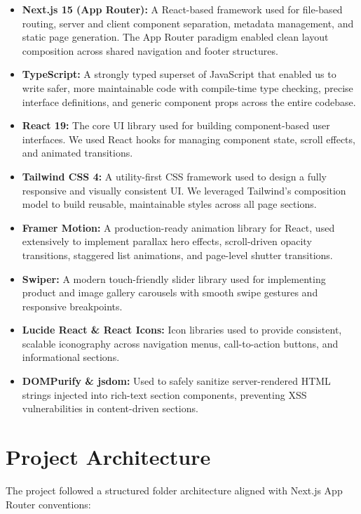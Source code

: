 \documentclass[12pt, oneside, a4paper]{book}
\begin{document}
\begin{doublespace}
\begin{itemize}
  \item \textbf{Next.js 15 (App Router):} A React-based framework used for file-based
  routing, server and client component separation, metadata management, and static
  page generation. The App Router paradigm enabled clean layout composition across
  shared navigation and footer structures.
  \item \textbf{TypeScript:} A strongly typed superset of JavaScript that enabled us
  to write safer, more maintainable code with compile-time type checking, precise
  interface definitions, and generic component props across the entire codebase.
  \item \textbf{React 19:} The core UI library used for building component-based user
  interfaces. We used React hooks for managing component state, scroll effects, and
  animated transitions.
  \item \textbf{Tailwind CSS 4:} A utility-first CSS framework used to design a
  fully responsive and visually consistent UI. We leveraged Tailwind's composition
  model to build reusable, maintainable styles across all page sections.
  \item \textbf{Framer Motion:} A production-ready animation library for React, used
  extensively to implement parallax hero effects, scroll-driven opacity transitions,
  staggered list animations, and page-level shutter transitions.
  \item \textbf{Swiper:} A modern touch-friendly slider library used for implementing
  product and image gallery carousels with smooth swipe gestures and responsive
  breakpoints.
  \item \textbf{Lucide React \& React Icons:} Icon libraries used to provide
  consistent, scalable iconography across navigation menus, call-to-action buttons,
  and informational sections.
  \item \textbf{DOMPurify \& jsdom:} Used to safely sanitize server-rendered HTML
  strings injected into rich-text section components, preventing XSS vulnerabilities
  in content-driven sections.
\end{itemize}

\section{Project Architecture}

The project followed a structured folder architecture aligned with Next.js App Router
conventions:


\end{doublespace}
\end{document}
